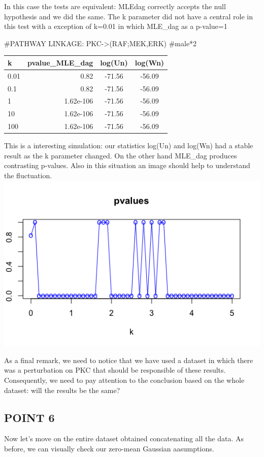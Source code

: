 \documentclass[
]{article}
\begin{document}
In this case the tests are equivalent: MLEdag correctly accepts the null
hypothesis and we did the same. The k parameter did not have a central
role in this test with a exception of k=0.01 in which MLE\_dag as a
p-value=1

\#PATHWAY LINKAGE: PKC-\textgreater(RAF;MEK,ERK) \#male*2

\begin{longtable}[]{@{}lrcc@{}}
\toprule
k & pvalue\_MLE\_dag & log(Un) & log(Wn)\tabularnewline
\midrule
\endhead
0.01 & 0.82 & -71.56 & -56.09\tabularnewline
0.1 & 0.82 & -71.56 & -56.09\tabularnewline
1 & 1.62e-106 & -71.56 & -56.09\tabularnewline
10 & 1.62e-106 & -71.56 & -56.09\tabularnewline
100 & 1.62e-106 & -71.56 & -56.09\tabularnewline
\bottomrule
\end{longtable}

This is a interesting simulation: our statistics log(Un) and log(Wn) had
a stable result as the k parameter changed. On the other hand MLE\_dag
produces contrasting p-values. Also in this situation an image should
help to understand the fluctuation.
\includegraphics{data/statistics_images/Part5.4.png}

As a final remark, we need to notice that we have used a dataset in
which there was a perturbation on PKC that should be responsible of
these results. Consequently, we need to pay attention to the conclusion
based on the whole dataset: will the results be the same?

\hypertarget{point-6}{%
\subsection{POINT 6}\label{point-6}}

Now let's move on the entire dataset obtained concatenating all the
data. As before, we can visually check our zero-mean Gaussian
aasumptions.
\end{document}
